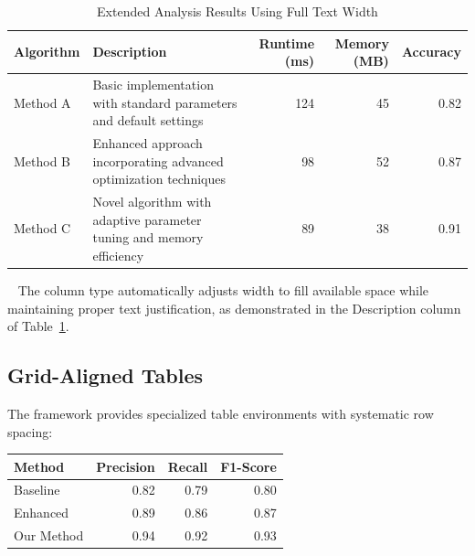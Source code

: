 \documentclass[11pt]{article}
\begin{document}
\begin{table}[tbp]
  \caption{Extended Analysis Results Using Full Text Width}
  \label{tab:extended-results}
  \centering
  \begin{tabularx}{\textwidth}{@{}lXrrr@{}}
    \toprule
    Algorithm & Description & Runtime (ms) & Memory (MB) & Accuracy \\
    \midrule
    Method A & Basic implementation with standard parameters and default settings & 124 & 45 & 0.82 \\
    Method B & Enhanced approach incorporating advanced optimization techniques & 98 & 52 & 0.87 \\
    Method C & Novel algorithm with adaptive parameter tuning and memory efficiency & 89 & 38 & 0.91 \\
    \bottomrule
  \end{tabularx}
  \begin{tablenotes}
  \end{tablenotes}
\end{table}

~ The  column type automatically adjusts width to fill available space while maintaining proper text justification, as demonstrated in the Description column of Table~\ref{tab:extended-results}.

\subsection{Grid-Aligned Tables}

The framework provides specialized table environments with systematic row spacing:

\begin{gridtable}[tbp]
  \caption{Grid-Aligned Table with Standard Row Height (~21.8pt measured)}
  \label{tab:grid-example}
  \centering
  \begin{tabular}{@{}lrrr@{}}
    \toprule
    Method & Precision & Recall & F1-Score \\
    \midrule
    Baseline & 0.82 & 0.79 & 0.80 \\
    Enhanced & 0.89 & 0.86 & 0.87 \\
    Our Method & 0.94 & 0.92 & 0.93 \\
    \bottomrule
  \end{tabular}
\end{gridtable}
\end{document}
